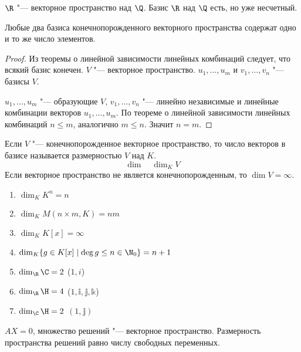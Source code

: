 \begin{exmp}
	$\R$ "--- векторное пространство над $\Q$.
	Базис $\R$ над $\Q$ есть, но уже несчетный.
\end{exmp}

\begin{theorem}
	Любые два базиса конечнопорожденного векторного пространства содержат одно и то же
	число элементов.
\end{theorem}

\begin{proof}
	Из теоремы о линейной зависимости линейных комбинаций следует, что всякий базис конечен.
	$V$ "--- векторное пространство.
	$u_1, \dots, u_m$ и $v_1, \dots, v_n$ "--- базисы $V$.

	$u_1, \dots, u_m$ "--- образующие $V$, $v_1, \dots, v_n$ "--- линейно независимые и линейные комбинации векторов $u_1, \dots, u_m$.
	По теореме о линейной зависимости линейных комбинаций $n \le m$, аналогично $m \le n$.
	Значит $n = m$.
\end{proof}

\begin{Def}
	Если $V$ "--- конечнопорожденное векторное пространство, то число векторов в базисе
	называется размерностью $V$ над $K$.
	\[\dim  \quad \dim_K V \]
	Если векторное пространство не является конечнопорожденным, то $\dim V = \infty$.
\end{Def}

\begin{exmp}
	\begin{enumerate}
		\item $\dim_K K^n = n$
		\item $\dim_K M(n \times m, K) = nm$
		\item $\dim_K K[x] = \infty$
		\item $\dim_{K}\{g \in K[x] \mid \deg g \le n \in \N_{0}\} = n + 1$
		\item $\dim_{\R}\C = 2$ ($1, i$)
		\item $\dim_{\R}\H = 4$ ($1, \mathbb{i}, \mathbb{j}, \mathbb{k}$)
		\item $\dim_{\C}\H = 2$ $(1, \mathbb{j})$
	\end{enumerate}
\end{exmp}

$AX = 0$, множество решений "--- векторное пространство.
Размерность пространства решений равно числу свободных переменных.
